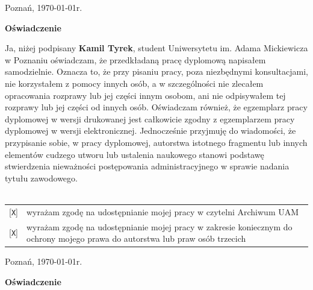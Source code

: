 \documentclass[oneside,polski,logo]{amuthesis}
\author{Kamil Tyrek, Mateusz Hypś, Jakub Kozubal}
\date{Poznań, luty 2021}
\begin{document}
\maketitle

\clearpage
\thispagestyle{plain}
\begin{flushright} Poznań, \today r. \end{flushright}

\begin{center}
    \Large
    \textbf{Oświadczenie}
 \end{center}
\vspace{0.4cm}

Ja, niżej podpisany \textbf{Kamil Tyrek}, student Uniwersytetu im. Adama Mickiewicza w Poznaniu oświadczam, że przedkładaną pracę dyplomową napisałem samodzielnie.
Oznacza to, że przy pisaniu pracy, poza niezbędnymi konsultacjami, nie korzystałem z pomocy innych osób, a w szczególności nie zlecałem opracowania rozprawy lub jej części innym osobom, ani nie odpisywałem tej rozprawy lub jej części od innych osób.
Oświadczam również, że egzemplarz pracy dyplomowej w wersji drukowanej jest całkowicie zgodny z egzemplarzem pracy dyplomowej w wersji elektronicznej.
Jednocześnie przyjmuję do wiadomości, że przypisanie sobie, w pracy dyplomowej, autorstwa istotnego fragmentu lub innych elementów cudzego utworu lub ustalenia naukowego stanowi podstawę stwierdzenia nieważności postępowania administracyjnego w sprawie nadania tytułu zawodowego.
  \vspace{2cm}%
  \\ \\
  \small\noindent\begin{tabularx}{\textwidth}{@{}lX}
  {[\texttt{\uppercase{X}}]} & wyra\.zam zgod\k{e} na udost\k{e}pnianie mojej pracy w czytelni Archiwum UAM\\[1ex]
  {[\texttt{\uppercase{X}}]} & wyra\.zam zgod\k{e} na udost\k{e}pnianie mojej pracy w zakresie koniecznym do ochrony mojego prawa do autorstwa lub praw os\'ob trzecich\\
  \end{tabularx}

\clearpage
\begin{flushright} Poznań, \today r. \end{flushright}

\begin{center}
    \Large
    \textbf{Oświadczenie}
 \end{center}
\vspace{0.4cm}
\end{document}
